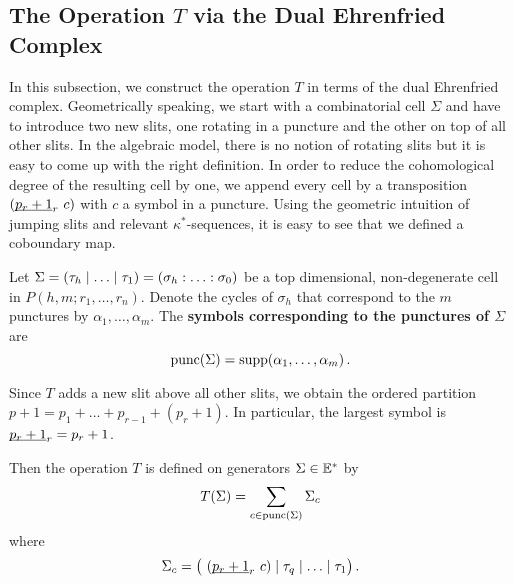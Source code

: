 \subsection{The Operation \texorpdfstring{$T$}{T} via the Dual Ehrenfried Complex}
In this subsection, we construct the operation $T$ in terms of the dual Ehrenfried complex.
Geometrically speaking, we start with a combinatorial cell $\Sigma$ and have to introduce two new slits,
one rotating in a puncture and the other on top of all other slits.
In the algebraic model, there is no notion of rotating slits but it is easy to come up with the right definition.
In order to reduce the cohomological degree of the resulting cell by one, we append every cell by a transposition $(\underline{\smash{p_r+1}}_r\ c)$ with $c$ a symbol in a puncture.
Using the geometric intuition of jumping slits and relevant $\kappa^\ast$-sequences, it is easy to see that we defined a coboundary map.

\begin{defi}
    \label{homology_operations:parallel_T:symbols_of_a_puncture}
    Let $\Sigma = \inhom = \homog$ be a top dimensional, non-degenerate cell in $P(h,m; r_1, \ldots, r_n)$.
    Denote the cycles of $\sigma_h$ that correspond to the $m$ punctures by $\alpha_1, \ldots, \alpha_m$.
    The {\bf symbols corresponding to the punctures of $\Sigma$} are
    \[
        \punc(\Sigma) = \supp(\alpha_1, \ldots, \alpha_m) \,.
    \]
\end{defi}
\begin{notation}
    Since $T$ adds a new slit above all other slits, we obtain the ordered partition $p+1 = p_1 + \ldots + p_{r-1} + (p_r+1)$.
    In particular, the largest symbol is $\underline{\smash{p_r+1}}_r = p_r+1$.
\end{notation}

\begin{defi}
    \label{homology_operations:parallel_T:defn_on_cells}
    Then the operation $T$ is defined on generators $\Sigma \in \mathbb E^\ast$ by
    \[
        T(\Sigma) = \sum_{c \in \operatorname{punc}(\Sigma)} \Sigma_c 
    \]
    where
    \[
        \Sigma_c = \big(\ (\ul{p_r+1}_r\ c) \mid \tau_q \mid \ldots \mid \tau_1 \big) \,.
    \]
\end{defi}

